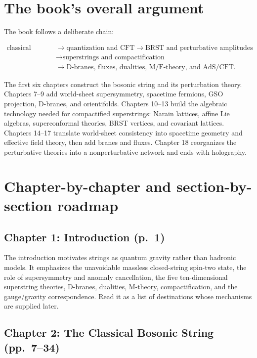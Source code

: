 \documentclass[
  10pt,
  a4paper,
  openany]{book}
\begin{document}
\section{The book's overall argument}\label{the-books-overall-argument}

The book follows a deliberate chain:

\[
\begin{aligned}
\text{classical string}
&\longrightarrow \text{quantization and CFT}
\longrightarrow \text{BRST and perturbative amplitudes} \\
&\longrightarrow \text{superstrings and compactification} \\
&\longrightarrow \text{D-branes, fluxes, dualities, M/F-theory, and AdS/CFT}.
\end{aligned}
\]

The first six chapters construct the bosonic string and its perturbation
theory. Chapters 7--9 add world-sheet supersymmetry, spacetime fermions,
GSO projection, D-branes, and orientifolds. Chapters 10--13 build the
algebraic technology needed for compactified superstrings: Narain
lattices, affine Lie algebras, superconformal theories, BRST vertices,
and covariant lattices. Chapters 14--17 translate world-sheet
consistency into spacetime geometry and effective field theory, then add
branes and fluxes. Chapter 18 reorganizes the perturbative theories into
a nonperturbative network and ends with holography.

\section{Chapter-by-chapter and section-by-section
roadmap}\label{chapter-by-chapter-and-section-by-section-roadmap}

\subsection{Chapter 1: Introduction
(p.~1)}\label{chapter-1-introduction-p.-1}

The introduction motivates strings as quantum gravity rather than
hadronic models. It emphasizes the unavoidable massless closed-string
spin-two state, the role of supersymmetry and anomaly cancellation, the
five ten-dimensional superstring theories, D-branes, dualities,
M-theory, compactification, and the gauge/gravity correspondence. Read
it as a list of destinations whose mechanisms are supplied later.

\subsection{Chapter 2: The Classical Bosonic String
(pp.~7--34)}\label{chapter-2-the-classical-bosonic-string-pp.-734}
\end{document}
